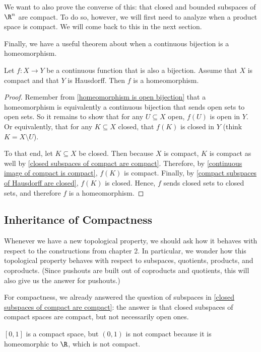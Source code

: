 \documentclass[noname]{notes}
\begin{document}
We want to also prove the converse of this: that closed and bounded subspaces of $\R^n$ are compact. To do so, however, we will first need to analyze when a product space is compact. We will come back to this in the next section. 

Finally, we have a useful theorem about when a continuous bijection is a homeomorphism. 

\begin{theorem}
	Let $f \colon X \to Y$ be a continuous function that is also a bijection. Assume that $X$ is compact and that $Y$ is Hausdorff. Then $f$ is a homeomorphism. 
\end{theorem}

\begin{proof}
	Remember from \cref{homeomorphism is open bijection} that a homeomorphism is equivalently a continuous bijection that sends open sets to open sets. So it remains to show that for any $U \subseteq X$ open, $f(U)$ is open in $Y$. Or equivalently, that for any $K \subseteq X$ closed, that $f(K)$ is closed in $Y$ (think $K = X \setminus U$).
	
	To that end, let $K \subseteq X$ be closed. Then because $X$ is compact, $K$ is compact as well by \cref{closed subspaces of compact are compact}. Therefore, by \cref{continuous image of compact is compact}, $f(K)$ is compact. Finally, by \cref{compact subspaces of Hausdorff are closed}, $f(K)$ is closed. Hence, $f$ sends closed sets to closed sets, and therefore $f$ is a homeomorphism.
\end{proof}

\subsection{Inheritance of Compactness}

Whenever we have a new topological property, we should ask how it behaves with respect to the constructions from chapter 2. In particular, we wonder how this topological property behaves with respect to subspaces, quotients, products, and coproducts. (Since pushouts are built out of coproducts and quotients, this will also give us the answer for pushouts.) 

For compactness, we already answered the question of subspaces in \cref{closed subspaces of compact are compact}: the answer is that closed subspaces of compact spaces are compact, but not necessarily open ones. 

\begin{example}
	$[0,1]$ is a compact space, but $(0,1)$ is not compact because it is homeomorphic to $\R$, which is not compact. 
\end{example}
\end{document}

